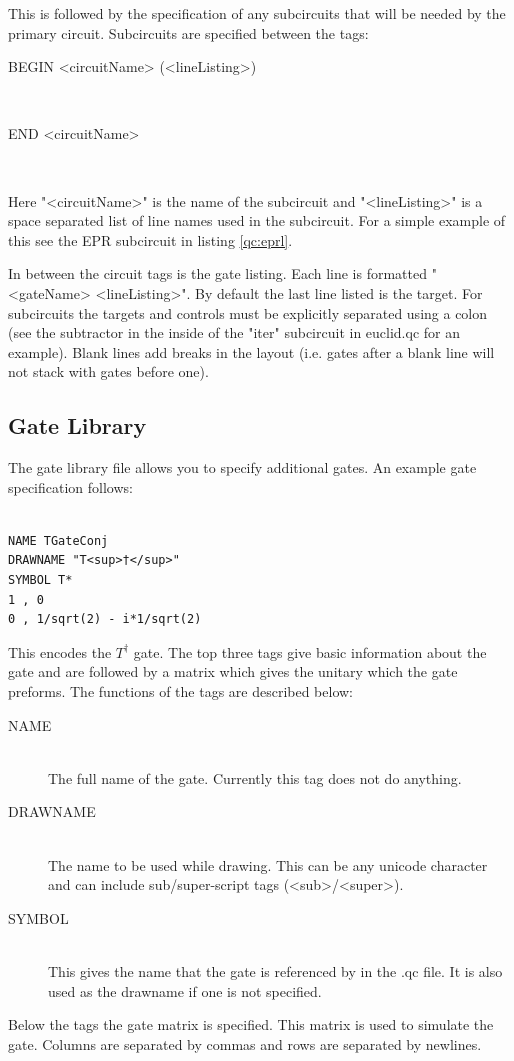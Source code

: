 \documentclass[10pt]{article}
\theoremstyle{definition}
\begin{document}
This is followed by the specification of any subcircuits that will be needed by the primary circuit.
Subcircuits are specified between the tags:
\begin{description}
\item[BEGIN <circuitName> (<lineListing>)] \hfill \\
\item[END <circuitName>] \hfill \\
\end{description}
Here "<circuitName>" is the name of the subcircuit and "<lineListing>" is a space separated list of line names
used in the subcircuit. For a simple example of this see the EPR subcircuit in listing \ref{qc:eprl}.

In between the circuit tags is the gate listing.  Each line is formatted "<gateName> <lineListing>".  By
default the last line listed is the target.  For subcircuits the targets and controls must be explicitly
separated using a colon (see the subtractor in the inside of the "iter" subcircuit in euclid.qc for an example).
Blank lines add breaks in the layout (i.e. gates after a blank line will not stack with gates before one).

\subsection{Gate Library}
The gate library file allows you to specify additional gates.  An example gate specification follows:

\small
\begin{verbatim}

NAME TGateConj
DRAWNAME "T<sup>†</sup>"
SYMBOL T*
1 , 0
0 , 1/sqrt(2) - i*1/sqrt(2)

\end{verbatim}
\normalsize

This encodes the $T^\dagger$ gate. The top three tags give basic information about the gate and 
are followed by a matrix which gives the unitary which the gate preforms.  The functions of the 
tags are described below:
\begin{description}
\item[NAME] \hfill \\
The full name of the gate.  Currently this tag does not do anything.
\item[DRAWNAME] \hfill \\
The name to be used while drawing.  This can be any unicode character 
and can include sub/super-script tags (<sub>/<super>).
\item[SYMBOL] \hfill \\
This gives the name that the gate is referenced by in the .qc file.  It is also used as the drawname if one is not
specified.
\end{description}
Below the tags the gate matrix is specified.  This matrix is used to simulate the gate.  Columns are separated by commas
and rows are separated by newlines.
\end{document}
